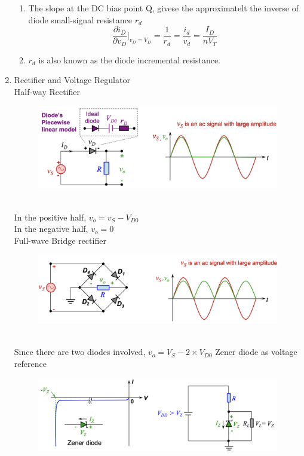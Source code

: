 \begin{enumerate}
\begin{enumerate}
        \item The slope at the DC bias point Q, givese the approximatelt the inverse of diode small-signal resistance $r_d$
        \[\frac{\partial i_D}{\partial v_D} \bigg|_{v_D = V_D} = \frac{1}{r_d} = \frac{i_d}{v_d} = \frac{I_D}{nV_T}\]
        \item $r_d$ is also known as the diode incremental resistance.
    \end{enumerate}
    \item Rectifier and Voltage Regulator\\
    Half-way Rectifier\\
    \begin{figure}[h]
        \centering
        \includegraphics[width=1\linewidth]{image/halfrect.png}
    \end{figure} \\
    In the positive half, \(v_o = v_S -V_{D0}\) \\
    In the negative half, \(v_o = 0\) \\
    Full-wave Bridge rectifier\\
    \begin{figure}[h]
        \centering
        \includegraphics[width=1\linewidth]{image/fullwavebridge.png}
    \end{figure} \\
    Since there are two diodes involved, \(v_o = V_S - 2\times V_{D0}\) 
    \newpage
    Zener diode as voltage reference
    \begin{figure}[h]
        \centering
        \includegraphics[width=1\linewidth]{image/zener.png}

\end{figure}
\end{enumerate}
